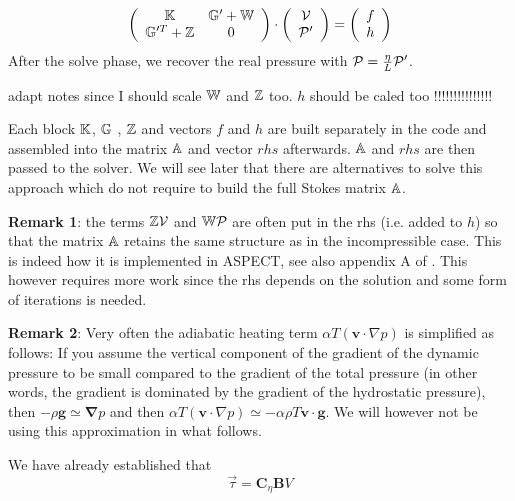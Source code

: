 \[
\left(
\begin{array}{cc}
{\mathbb{K}} & {\mathbb{G}}'+{\mathbb{W}} \\ {\mathbb{G}}'^T+{\mathbb{Z}} & 0 
\end{array}
\right)
\cdot
\left(
\begin{array}{c}
{\cal V} \\ {\cal P}'
\end{array}
\right)
=
\left(
\begin{array}{c}
 f \\ h
\end{array}
\right)
\]
After the solve phase, we recover the real pressure with ${\cal P}=\frac{\eta}{L}{\cal P}'$.

{\color{red} adapt notes since I should scale ${\mathbb{W}}$ and ${\mathbb{Z}}$ too}.
{\color{red} $h$ should be caled too !!!!!!!!!!!!!!!} 

Each block ${\mathbb{K}}$, ${\mathbb{G}}$ , ${\mathbb{Z}}$ and vectors $f$ and $h$ are built separately 
in the code and assembled into 
the matrix ${\mathbb{A}}$ and vector $rhs$ afterwards. ${\mathbb{A}}$ and $rhs$ are then passed to the solver. 
We will see later that there are alternatives to solve this approach which do not require to 
build the full Stokes matrix ${\mathbb{A}}$. 

{\bf Remark 1}: the terms ${\mathbb{Z}} {\cal V}$ and ${\mathbb{W}} {\cal P}$ are 
often put in the rhs (i.e. added to $h$) so that 
the matrix ${\mathbb{A}}$ retains the same structure as in the incompressible case. This is indeed 
how it is implemented in ASPECT, see also appendix A of \cite{lezh08}. This however requires more work since the rhs depends 
on the solution and some form of iterations is needed. 

{\bf Remark 2}: Very often the adiabatic heating term  
$\alpha T \left( \bm v \cdot \nabla p \right)$ is simplified as follows:
If you assume the vertical component of the gradient of the dynamic pressure to be small compared to the
gradient of the total pressure (in other words, the gradient is dominated by the gradient of the hydrostatic
pressure), then $-\rho {\bm g} \simeq {\bm \nabla}p$ and then 
$\alpha T \left( \bm v \cdot \nabla p \right) \simeq  -\alpha\rho T {\bm v}\cdot{\bm g}$. We will however 
not be using this approximation in what follows.



We have already established that
\[
\vec{\tau} = {\bm C}_\eta {\bm B} V
\]


